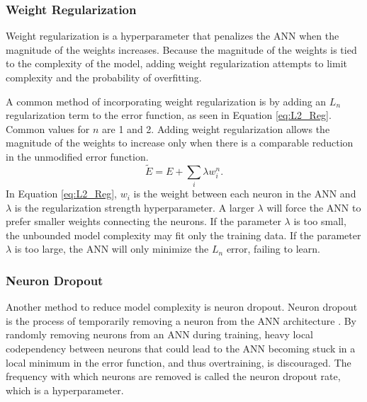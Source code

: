 
\subsubsection{Weight Regularization}

Weight regularization is a hyperparameter that penalizes the ANN when the magnitude of the weights increases. Because the magnitude of the weights is tied to the complexity of the model, adding weight regularization attempts to limit complexity and the probability of overfitting.

A common method of incorporating weight regularization is by adding an $L_n$ regularization term to the error function, as seen in Equation \ref{eq:L2_Reg}. Common values for $n$ are 1 and 2. Adding weight regularization allows the magnitude of the weights to increase only when there is a comparable reduction in the unmodified error function.
%
\begin{equation} \label{eq:L2_Reg}
\tilde{E} = E + \sum_i \lambda w_i^n.
\end{equation}
%
In Equation \ref{eq:L2_Reg}, $w_i$ is the weight between each neuron in the ANN and $\lambda$ is the regularization strength hyperparameter. A larger $\lambda$ will force the ANN to prefer smaller weights connecting the neurons. If the parameter $\lambda$ is too small, the unbounded model complexity may fit only the training data. If the parameter $\lambda$ is too large, the ANN will only minimize the $L_n$ error, failing to learn.

\subsubsection{Neuron Dropout}

Another method to reduce model complexity is neuron dropout. Neuron dropout is the process of temporarily removing a neuron from the ANN architecture \cite{Srivastava2014}. By randomly removing neurons from an ANN during training, heavy local codependency between neurons that could lead to the ANN becoming stuck in a local minimum in the error function, and thus overtraining, is discouraged. The frequency with which neurons are removed is called the neuron dropout rate, which is a hyperparameter.

